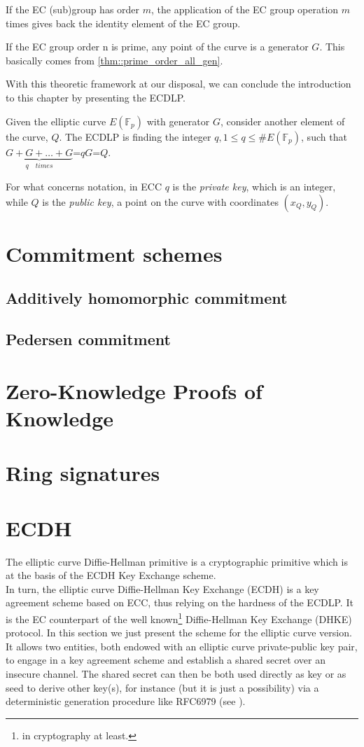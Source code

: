 \begin{myrem}
    If the EC (sub)group has order $m$, the application of the EC group operation $m$ times gives back the identity element of the EC group.
\end{myrem}
\begin{myrem}
    If the EC group order n is prime, any point of the curve is a generator $G$. This basically comes from \ref{thm::prime_order_all_gen}.
\end{myrem}
\noindent
With this theoretic framework at our disposal, we can conclude the introduction to this chapter by presenting the ECDLP.
\begin{mydef}
    Given the elliptic curve $E(\mathbb{F}_p)$ with generator $G$, consider another element of the curve, $Q$. The ECDLP is finding the integer $q, 1 \leq q \leq \#E(\mathbb{F}_p)$, such that $\underbrace{G+G+\dots+G}_{q \quad times}$=$qG$=$Q$.
\end{mydef}
\noindent
For what concerns notation, in ECC $q$ is the \textit{private key}, which is an integer, while $Q$ is the \textit{public key}, a point on the curve with coordinates $(x_Q, y_Q)$.

\section{Commitment schemes}
\subsection{Additively homomorphic commitment}
\subsection{Pedersen commitment}
\section{Zero-Knowledge Proofs of Knowledge}
\section{Ring signatures}
\section{ECDH}
The elliptic curve Diffie-Hellman primitive is a cryptographic primitive which is at the basis of the ECDH Key Exchange scheme.\\
In turn, the elliptic curve Diffie-Hellman Key Exchange (ECDH) is a key agreement scheme based on ECC, thus relying on the hardness of the ECDLP. It is the EC counterpart of the well known\footnote{in cryptography at least.} Diffie-Hellman Key Exchange (DHKE) protocol. In this section we just present the scheme for the elliptic curve version.\\
It allows two entities, both endowed with an elliptic curve private-public key pair, to engage in a key agreement scheme and establish a shared secret over an insecure channel. The shared secret can then be both used directly as key or as seed to derive other key(s), for instance (but it is just a possibility) via a deterministic generation procedure like RFC6979 (see \cite{rfc6979}).
